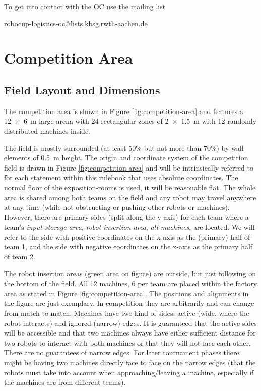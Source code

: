 \documentclass[12pt,twoside]{article}
\begin{document}
\noindent
To get into contact with the OC use the mailing list\\
\centerline{\url{robocup-logistics-oc@lists.kbsg.rwth-aachen.de}}


\section{Competition Area} \label{sec:area}
\subsection{Field Layout and Dimensions}
\label{sec:competition-area}

The competition area is shown in Figure \ref{fig:competition-area} and
features a \SI{12 x 6}{\metre} large arena with 24 rectangular zones
of \SI{2 x 1.5}{\metre} with 12 randomly distributed machines inside.

The field is mostly surrounded (at least 50\% but not more than 70\%)
by wall elements of \SI{0.5}{\metre} height.  The origin and
coordinate system of the competition field is drawn in Figure
\ref{fig:competition-area} and will be intrinsically referred to for
each statement within this rulebook that uses absolute coordinates.
The normal floor of the exposition-rooms is used, it will be
reasonable flat. The whole area is shared among both teams on the
field and any robot may travel anywhere at any time (while not
obstructing or pushing other robots or machines). However, there are
primary sides (split along the y-axis) for each team where a team's
\textit{input storage area}, \textit{robot insertion area},
\textit{all machines}, are located. We will refer to the side with
positive coordinates on the x-axis as the (primary) half of team 1,
and the side with negative coordinates on the x-axis as the primary
half of team 2.

The robot insertion areas (green area on figure) are outside, but just following on the
bottom of the field.
All 12 machines, 6 per team are placed within the factory area as stated in Figure
\ref{fig:competition-area}.
The positions and alignments in the figure are just exemplary.
In competition they are arbitrarily and can change from match to match.
Machines have two kind of sides: active (wide, where the robot
interacts) and ignored (narrow) edges.
It is guaranteed that the active sides will be accessible and that 
two machines always have either sufficient distance for two robots to interact 
with both machines or that they will not face each other. There are no guarantees of narrow edges. 
For later tournament phases there might be having two machines directly face to 
face on the narrow edges (that the robots must take into account when 
approaching/leaving a machine, especially if the machines are from different teams).
\end{document}
